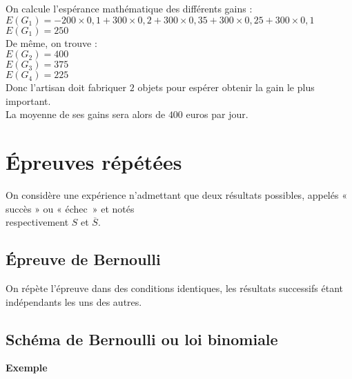 \vspace*{.3cm}

On calcule l'espérance mathématique des différents gains : \\

$E(G_1) = -200 \times 0,1 + 300 \times 0,2 + 300 \times 0,35 + 300 \times 0,25 + 300 \times 0,1$ \\
$E(G_1) = 250$ \\

De même, on trouve : \\ 

$E(G_2) = 400$ \\

$E(G_3) = 375$ \\

$E(G_4) = 225$ \\

Donc l'artisan doit fabriquer $2$ objets pour espérer obtenir la gain le plus important. \\ La moyenne de ses gains sera alors de $400$ euros par jour.

\newpage

\vspace*{-2.3cm}

\section{Épreuves répétées}

On considère une expérience n'admettant que deux résultats possibles, appelés « succès » ou « échec~» et notés \\ respectivement $S$ et $\overline{S} $.

\vspace*{-.3cm}

\subsection{Épreuve de Bernoulli}

On répète l'épreuve dans des conditions identiques, les résultats successifs étant indépendants les uns des autres. 

\vspace*{-.3cm}

\subsection{Schéma de Bernoulli ou loi binomiale}

\textbf{Exemple}

